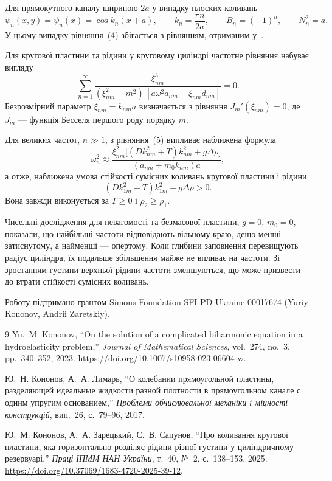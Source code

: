 Для прямокутного каналу шириною $2a$ у випадку плоских коливань
\[
 \psi_n(x,y)=\psi_n(x)=\cos k_n(x+a),\qquad
 k_n=\frac{\pi n}{2a},\qquad
 B_n=(-1)^n,
 \qquad N_n^2=a.
\]
У цьому випадку рівняння~(4) збігається з рівнянням, отриманим у~\cite{fluidplate:kononov2017}.

Для кругової пластини та рідини у круговому циліндрі частотне рівняння набуває вигляду
\begin{equation}
 \sum_{n=1}^{\infty}
 \frac{\xi_{nm}^3}
 {(\xi_{nm}^2-m^2)\,[a\omega^2 a_{nm}-\xi_{nm}d_{nm}]}=0.
\end{equation}
Безрозмірний параметр $\xi_{nm}=k_{nm}a$ визначається з рівняння $J_m'(\xi_{nm})=0$, де $J_m$ --- функція Бесселя першого роду порядку $m$.

Для великих частот, $n\gg1$, з рівняння~(5) випливає наближена формула
\[
 \omega_n^2\approx
 \frac{\xi_{nm}^2\bigl[(Dk_{nm}^2+T)k_{nm}^2+g\Delta\rho\bigr]}
 {(a_{nm}+m_0k_{nm})a},
\]
а отже, наближена умова стійкості сумісних коливань кругової пластини і рідини
\begin{equation}
 (Dk_{1m}^2+T)k_{1m}^2+g\Delta\rho>0.
\end{equation}
Вона завжди виконується за $T\ge0$ і $\rho_2\ge\rho_1$.

Чисельні дослідження для невагомості та безмасової пластини, $g=0$, $m_0=0$, показали, що найбільші частоти відповідають вільному краю, дещо менші --- затиснутому, а найменші --- опертому. Коли глибини заповнення перевищують радіус циліндра, їх подальше збільшення майже не впливає на частоти. Зі зростанням густини верхньої рідини частоти зменшуються, що може призвести до втрати стійкості сумісних коливань.

Роботу підтримано грантом Simons Foundation SFI-PD-Ukraine-00017674 (Yuriy Kononov, Andrii Zaretskiy).

\begin{thebibliography}{9}
Yu.~M. Kononov,
``On the solution of a complicated biharmonic equation in a hydroelasticity problem,''
\emph{Journal of Mathematical Sciences}, vol.~274, no.~3, pp.~340--352, 2023.
\url{https://doi.org/10.1007/s10958-023-06604-w}.

Ю.~Н. Кононов, А.~А. Лимарь,
``О колебании прямоугольной пластины, разделяющей идеальные жидкости разной плотности в прямоугольном канале с одним упругим основанием,''
\emph{Проблеми обчислювальної механіки і міцності конструкцій}, вип.~26, с.~79--96, 2017.

Ю.~М. Кононов, А.~А. Зарецький, С.~В. Сапунов,
``Про коливання кругової пластини, яка горизонтально розділяє рідини різної густини у циліндричному резервуарі,''
\emph{Праці ІПММ НАН України}, т.~40, №~2, с.~138--153, 2025.
\url{https://doi.org/10.37069/1683-4720-2025-39-12}.
\end{thebibliography}

